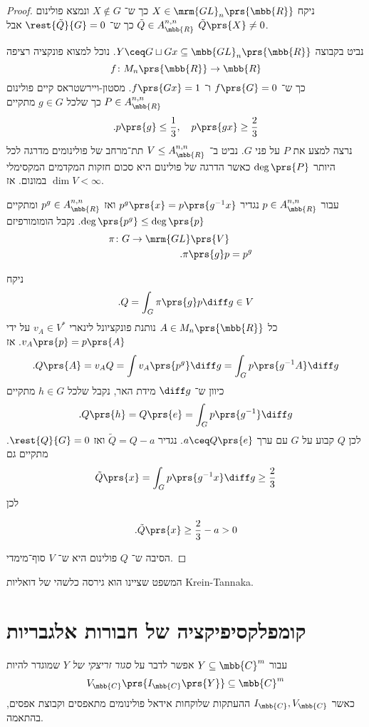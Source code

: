 \documentclass[10pt, twoside]{book}
\newcommand{\textenglish}[1]{\foreignlanguage{english}{#1}}
\begin{document}
\begin{proof}
ניקח
$X \in \mrm{GL}_n\prs{\mbb{R}}$
כך ש־%
$X \notin G$
ונמצא פולינום
$\tilde{Q} \in A^{n,n}_{\mbb{R}}$
כך ש־%
$\rest{\tilde{Q}}{G} = 0$
אבל
$\tilde{Q}\prs{X} \neq 0$.

נביט בקבוצה
$Y \ceq G \sqcup G x \subseteq \mbb{GL}_n\prs{\mbb{R}}$.
נוכל למצוא פונקציה רציפה
\[f \colon M_n\prs{\mbb{R}} \to \mbb{R}\]
כך ש־%
$f\prs{G} = 0$
ו־%
$f\prs{G x} = 1$.
מסטון-ויירשטראס קיים פולינום
$P \in A^{n,n}_{\mbb{R}}$
כך שלכל
$g \in G$
מתקיים
\[\text{.} p\prs{g} \leq \frac{1}{3}, \quad p\prs{gx} \geq \frac{2}{3}\]
נרצה למצע את
$P$
על פני
$G$.
נביט ב־%
$V \leq A^{n,n}_{\mbb{R}}$
תת־מרחב של פולינומים מדרגה לכל היותר
$\deg\prs{P}$
כאשר הדרגה של פולינום היא סכום חזקות המקדמים המקסימלי במונום.
אז
$\dim V < \infty$.

עבור
$p \in A^{n,n}_{\mbb{R}}$
נגדיר
$p^g\prs{x} = p\prs{g^{-1} x}$
ואז
$p^g \in A^{n,n}_{\mbb{R}}$
ומתקיים
$\deg\prs{p^g} \leq \deg\prs{p}$.
נקבל הומומורפיזם
\begin{align*}
\pi \colon G \to \mrm{GL}\prs{V} \\
\text{.} \pi\prs{g} p &= p^g
\end{align*}

ניקח
\[\text{.}Q = \int_G \pi\prs{g} p \diff g \in V\]
כל
$A \in M_n\prs{\mbb{R}}$
נותנת פונקציונל לינארי
$v_A \in V^*$
על ידי
$v_A\prs{p} = p\prs{A}$.
אז
\[\text{.} Q\prs{A} = v_A Q = \int v_A\prs{p^g} \diff g = \int_G p\prs{g^{-1} A} \diff g\]
כיוון ש־%
$\diff g$
מידת האר, נקבל שלכל
$h \in G$
מתקיים
\[\text{.} Q\prs{h} = Q\prs{e} = \int_G p\prs{g^{-1}} \diff g\]
לכן
$Q$
קבוע על
$G$
עם ערך
$a \ceq Q\prs{e}$.
נגדיר
$\tilde{Q} = Q - a$
ואז
$\rest{Q}{G} = 0$.
מתקיים גם
\[\tilde{Q}\prs{x} = \int_G p\prs{g^{-1} x}\diff g \geq \frac{2}{3}\]
לכן
\begin{otherlanguage}{english}
\[\text{.} \tilde{Q}\prs{x} \geq \frac{2}{3} - a > 0\]
\end{otherlanguage}

הסיבה ש־%
$Q$
פולינום היא ש־%
$V$
סוף־מימדי.
\end{proof}

המשפט שציינו הוא גירסה כלשהי של דואליות
\textenglish{Krein-Tannaka}.

\section{קומפלקסיפיקציה של חבורות אלגבריות}

\begin{definition}
עבור
$Y \subseteq \mbb{C}^m$
אפשר לדבר על
\emph{סגור זריצקי של
$Y$}
שמוגדר להיות
\[V_{\mbb{C}}\prs{I_{\mbb{C}}\prs{Y}} \subseteq \mbb{C}^m\]
כאשר
$I_{\mbb{C}}, V_{\mbb{C}}$
ההעתקות שלוקחות אידאל פולינומים מתאפסים וקבוצת אפסים, בהתאמה.
\end{definition}
\end{document}
